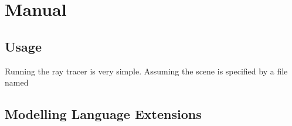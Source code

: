 \chapter{Manual}

\section{Usage}
Running the ray tracer is very simple. Assuming the scene is specified by a file
named 

\section{Modelling Language Extensions}
